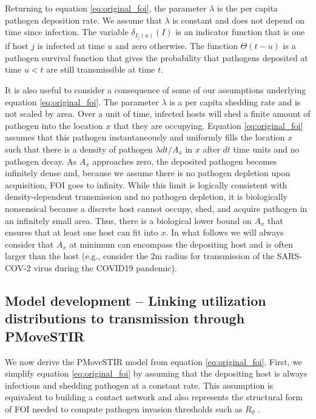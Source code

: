 \documentclass[letterpaper]{article}
\begin{document}
Returning to equation \ref{eq:original_foi}, the parameter $\lambda$ is the per capita pathogen deposition rate. We assume that $\lambda$ is constant and does not depend on time since infection. The variable  $\delta_{I_j(u)}(I)$ is an indicator function that is one if host $j$ is infected at time $u$ and zero otherwise.  The function $\Theta(t - u)$ is a pathogen survival function that gives the probability that pathogens deposited at time $u < t$ are still transmissible at time $t$.  

It is also useful to consider a consequence of some of our assumptions underlying equation \ref{eq:original_foi}. The parameter $\lambda$ is a per capita shedding rate and is not scaled by area. Over a unit of time, infected hosts will shed a finite amount of pathogen into the location $x$ that they are occupying.  Equation \ref{eq:original_foi} assumes that this pathogen instantaneously and uniformly fills the location $x$ such that there is a density of pathogen $\lambda dt / A_x$ in $x$ after $dt$ time units and no pathogen decay. 
As $A_x$ approaches zero, the deposited pathogen becomes infinitely dense and, because we assume there is no pathogen depletion upon acquisition, FOI goes to infinity.  While this limit is logically consistent with density-dependent transmission and no pathogen depletion, it is biologically nonsensical because a discrete host cannot occupy, shed, and acquire pathogen in an infinitely small area. Thus, there is a biological lower bound on $A_x$ that ensures that at least one host can fit into $x$. In what follows we will always consider that $A_x$ at minimum can encompass the depositing host and is often larger than the host (e.g., consider the 2m radius for transmission of the SARS-COV-2 virus during the COVID19 pandemic).

\subsection*{Model development -- Linking utilization distributions to transmission through PMoveSTIR}

We now derive the PMoveSTIR model from equation \ref{eq:original_foi}. First, we simplify equation \ref{eq:original_foi} by assuming that the depositing host is always infectious and shedding pathogen at a constant rate. This assumption is equivalent to building a contact network and also represents the structural form of FOI needed to compute pathogen invasion thresholds such as $R_0$ \citep[see][]{Wilber2022}.
\end{document}
